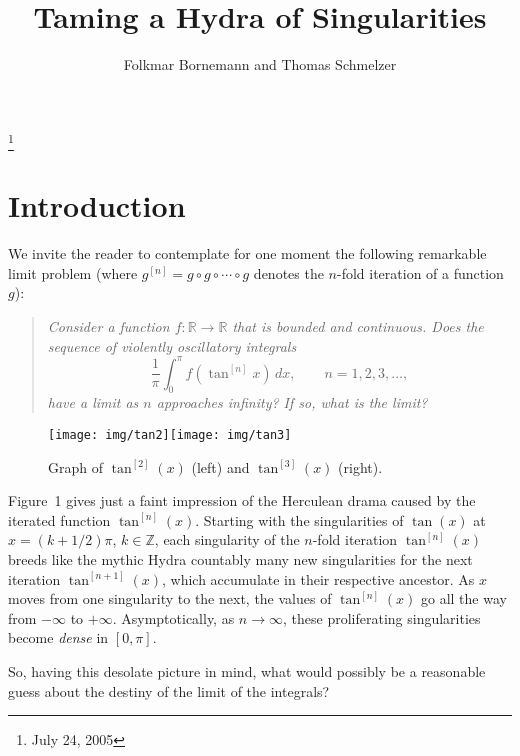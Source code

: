\documentclass[10pt]{amsart}
\newcommand{\R}{{\mathbb  R}}
\newcommand{\Z}{{\mathbb  Z}}
\begin{document}
\title{Taming a Hydra of Singularities}
\author{Folkmar Bornemann and Thomas Schmelzer}
\keywords{} \subjclass{}
\thanks{July 24, 2005}
\maketitle

\section{Introduction}
\noindent
We invite the reader to contemplate for one moment the following remarkable limit problem
(where $g^{[n]} = g \circ g \circ \cdots \circ g$ denotes the $n$-fold iteration of a function $g$):

\bigskip

\begin{quote}{\em
Consider a function $f: \R \to \R$ that is bounded and continuous. Does the sequence of violently oscillatory integrals
\[
\frac{1}{\pi}\int_0^\pi f(\tan^{[n]}x)\,dx, \qquad n=1,2,3,\ldots,
\]
have a limit as $n$ approaches infinity? If so, what is the limit?}
\end{quote}

\medskip

\begin{figure}[hb]
\begin{center}
\hspace*{-0.5mm}\texttt{[image: img/tan2]}\;\texttt{[image: img/tan3]}
\end{center}
\caption{Graph of  $\tan^{[2]}(x)$ (left) and $\tan^{[3]}(x)$ (right).}
\end{figure}
%
\noindent
Figure~1 gives just a faint impression of the Herculean drama caused by the iterated function $\tan^{[n]}(x)$. Starting with the singularities
of $\tan(x)$ at $x=(k+1/2)\pi$, $k \in \Z$, each singularity of the $n$-fold iteration $\tan^{[n]}(x)$
breeds like the mythic Hydra countably many new singularities for the next iteration $\tan^{[n+1]}(x)$, which accumulate in their respective ancestor.
As $x$ moves from one singularity to the next, the values of $\tan^{[n]}(x)$  go all the way from $-\infty$ to $+\infty$. Asymptotically,
as $n\to\infty$, these proliferating singularities become \emph{dense} in $[0,\pi]$.

So, having this desolate picture in mind, what would possibly be a reasonable guess about the destiny of the limit of the integrals?
\end{document}
